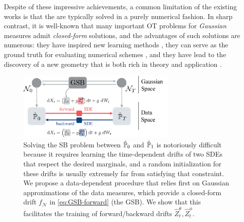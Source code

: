 
Despite of these impressive achievements, a common limitation of the existing works is that the  are typically solved in a purely {numerical} fashion. In sharp contrast, it is well-known that many important \acrshort{OT} problems for \emph{Gaussian} measures admit \emph{closed-form} solutions, and the advantages of such solutions are numerous: they have inspired new learning methods \citep{rabin2011wasserstein, vayer2019sliced, bonneel2015sliced}, they can serve as the ground truth for evaluating numerical schemes \citep{janati2020entropic}, and they have lead to the discovery of a new geometry that is both rich in theory and application \citep{takatsu2010wasserstein}. 

\begin{figure}[t]
    \centering
    \includegraphics[width=0.7\textwidth]{figures/fig_overview_gsb.pdf}
    \caption{Solving the \acrshort{SB} problem between $\hat{\mathbb{P}}_{ {0} }$ and $\hat{\mathbb{P}}_{ {1}}$ is notoriously difficult because it requires learning the time-dependent drifts of two SDEs that respect the desired marginals, and a random initialization for these drifts is usually extremely far from satisfying that constraint. We propose a data-dependent procedure that relies first on Gaussian approximations of the data measures, which provide a closed-form drift $f_{\mathcal{N}}$ in \eqref{eq:GSB-forward} (the \acrshort{GSB}). We show that this facilitates the training of forward/backward drifts $\hat{Z}^\theta_t, \hat{Z}^\phi_t$.}
    \label{fig:overview_gsbflow}
\end{figure}

